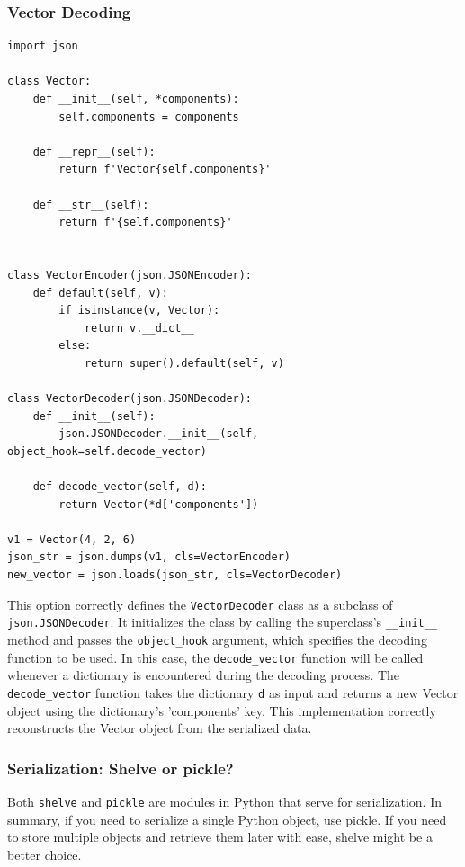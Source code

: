 \subsubsection{Vector Decoding}
\begin{codebox}
\begin{verbatim}
import json
 
class Vector:
    def __init__(self, *components):
        self.components = components
 
    def __repr__(self):
        return f'Vector{self.components}'
 
    def __str__(self):
        return f'{self.components}'
 
 
class VectorEncoder(json.JSONEncoder):
    def default(self, v):
        if isinstance(v, Vector):
            return v.__dict__
        else:
            return super().default(self, v)

class VectorDecoder(json.JSONDecoder):
    def __init__(self):
        json.JSONDecoder.__init__(self, object_hook=self.decode_vector)
 
    def decode_vector(self, d):
        return Vector(*d['components'])

v1 = Vector(4, 2, 6)
json_str = json.dumps(v1, cls=VectorEncoder)
new_vector = json.loads(json_str, cls=VectorDecoder)
\end{verbatim}
\end{codebox}

This option correctly defines the \texttt{VectorDecoder} class as a subclass of \texttt{json.JSONDecoder}. It initializes the class by calling the superclass's \texttt{\_\_init\_\_} method and passes the \texttt{object\_hook} argument, which specifies the decoding function to be used. In this case, the \texttt{decode\_vector} function will be called whenever a dictionary is encountered during the decoding process. The \texttt{decode\_vector} function takes the dictionary \texttt{d} as input and returns a new Vector object using the dictionary's 'components' key. This implementation correctly reconstructs the Vector object from the serialized data.

\newpage
\subsubsection{Serialization: Shelve or pickle?}
Both \texttt{shelve} and \texttt{pickle} are modules in Python that serve for serialization. In summary, if you need to serialize a single Python object, use pickle. If you need to store multiple objects and retrieve them later with ease, shelve might be a better choice.

